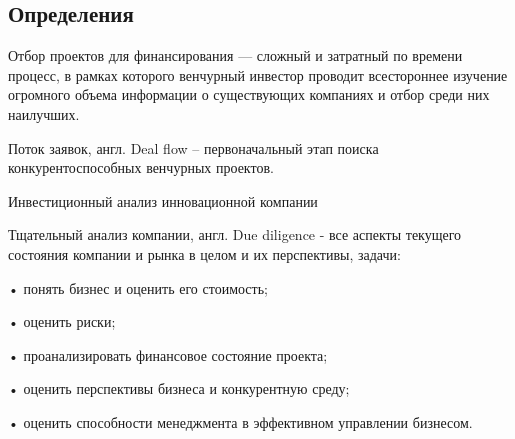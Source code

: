 \documentclass[_Venture_p2.tex]{subfiles}
\begin{document}

\subsection{Определения}
\begin{frame}{}
\begin{block}{Отбор проектов для финансирования}
\quad
— сложный и затратный по времени процесс, в рамках которого венчурный инвестор проводит всестороннее изучение огромного объема информации о существующих компаниях и отбор среди них наилучших.
\end{block}

\begin{block}{Поток заявок, англ. Deal flow}
\quad
 – первоначальный этап поиска конкурентоспособных венчурных проектов. 
\end{block}

\end{frame}

\begin{frame}{Инвестиционный анализ инновационной компании}
\begin{block}{Тщательный анализ компании, англ. Due diligence}
	\quad
	- все аспекты текущего состояния компании и рынка в целом и их перспективы, задачи:
	
	•	понять бизнес и оценить его стоимость;
	
	•	оценить риски;
	
	•	проанализировать финансовое состояние проекта;
	
	•	оценить перспективы бизнеса и конкурентную среду;
	
	•	оценить способности менеджмента в эффективном управлении бизнесом.
\end{block}
\end{frame}

\end{document}
